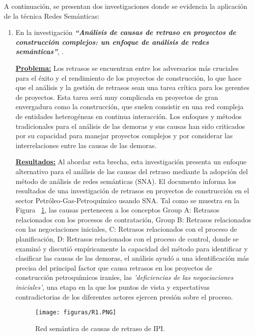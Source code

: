 \documentclass[10pt,conference]{IEEEtran}
\begin{document}
A continuación, se presentan dos investigaciones donde se evidencia la aplicación de la técnica Redes Semánticas:
\begin{enumerate}
\item En la investigación \textit{\textbf{“Análisis de causas de retraso en proyectos de construcción complejos: un enfoque de análisis de redes semánticas”}}, \citep{zarei2018delay}.

\textbf{\underline{Problema:}} Los retrasos se encuentran entre los adversarios más cruciales para el éxito y el rendimiento de los proyectos de construcción, lo que
hace que el análisis y la gestión de retrasos sean una tarea crítica para los gerentes de proyectos. Esta tarea será muy complicada en proyectos de gran envergadura como la construcción, que suelen consistir en una red compleja de entidades heterogéneas en continua interacción. Los enfoques y métodos tradicionales para el análisis de las demoras y sus causas han sido criticados por su capacidad para manejar proyectos complejos y por considerar las interrelaciones entre las causas de las demoras. 

\textbf{\underline{Resultados:}} Al abordar esta brecha, esta investigación presenta un enfoque alternativo para el análisis de las causas del retraso mediante la adopción del método de análisis de redes semánticas (SNA). El documento informa los resultados de una investigación de retrasos en proyectos de construcción en el sector Petróleo-Gas-Petroquímico usando SNA. Tal como se muestra en la Figura  ~\ref{R1}, las causas pertenecen a los conceptos Group A: Retrasos relacionados con los procesos de contratación, Group B: Retrasos relacionados con las negociaciones iniciales, C: Retrasos relacionados con el proceso de planificación, D: Retrasos relacionados con el proceso de control, donde se examinó y discutió empíricamente la capacidad del método para identificar y clasificar las causas de las demoras, el análisis ayudó a una identificación más precisa del principal factor que causa retrasos en los proyectos de construcción petroquímicos iraníes, las \textit{'deficiencias de las negociaciones iniciales'}, una etapa en la que los puntos de vista y expectativas contradictorias de los diferentes actores ejercen presión sobre el proceso. 

\begin{figure}[H]
\begin{center}
\texttt{[image: figuras/R1.PNG]}
\caption{Red semántica de causas de retraso de IPI.}
\label{R1} 
\end{center}
\end{figure}


\end{enumerate}
\end{document}
